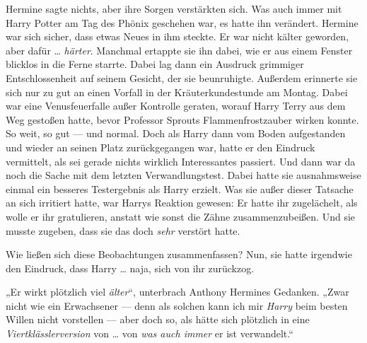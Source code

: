 Hermine sagte nichts, aber ihre Sorgen verstärkten sich. Was auch immer mit Harry Potter am Tag des Phönix geschehen war, es hatte ihn verändert. Hermine war sich sicher, dass etwas Neues in ihm steckte. Er war nicht kälter geworden, aber dafür … \emph{härter}. Manchmal ertappte sie ihn dabei, wie er aus einem Fenster blicklos in die Ferne starrte. Dabei lag dann ein Ausdruck grimmiger Entschlossenheit auf seinem Gesicht, der sie beunruhigte. Außerdem erinnerte sie sich nur zu gut an einen Vorfall in der Kräuterkundestunde am Montag. Dabei war eine Venusfeuerfalle außer Kontrolle geraten, worauf Harry Terry aus dem Weg gestoßen hatte, bevor Professor Sprouts Flammenfrostzauber wirken konnte. So weit, so gut — und normal. Doch als Harry dann vom Boden aufgestanden und wieder an seinen Platz zurückgegangen war, hatte er den Eindruck vermittelt, als sei gerade nichts wirklich Interessantes passiert. Und dann war da noch die Sache mit dem letzten Verwandlungstest. Dabei hatte sie ausnahmsweise einmal ein besseres Testergebnis als Harry erzielt. Was sie außer dieser Tatsache an sich irritiert hatte, war Harrys Reaktion gewesen: Er hatte ihr zugelächelt, als wolle er ihr gratulieren, anstatt wie sonst die Zähne zusammenzubeißen. Und sie musste zugeben, dass sie das doch \emph{sehr} verstört hatte.

%
Wie ließen sich diese Beobachtungen zusammenfassen? Nun, sie hatte irgendwie den Eindruck, dass Harry … naja, sich von ihr zurückzog.

„Er wirkt plötzlich viel \emph{älter}“, unterbrach Anthony Hermines Gedanken.
„Zwar nicht wie ein Erwachsener — denn als solchen kann ich mir \emph{Harry} beim besten Willen nicht vorstellen — aber doch so, als hätte sich plötzlich in eine \emph{Viertklässlerversion} von … von \emph{was auch immer} er ist verwandelt.“

